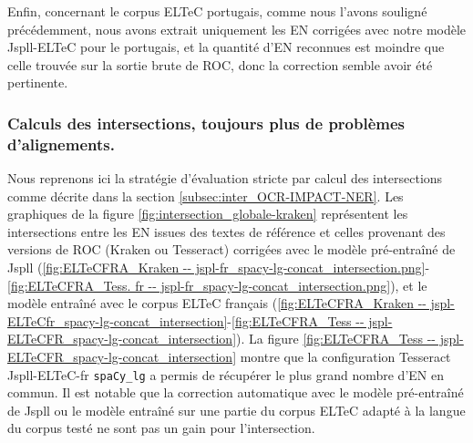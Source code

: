 Enfin, concernant le corpus ELTeC portugais, comme nous l'avons souligné précédemment, nous avons extrait uniquement les EN corrigées avec notre modèle Jspll-ELTeC pour le portugais, et la quantité d'EN reconnues est moindre que celle trouvée sur la sortie brute de ROC, donc la correction semble avoir été pertinente.

\subsubsection{Calculs des intersections, toujours plus de problèmes d'alignements. }

Nous reprenons ici la stratégie d'évaluation stricte par calcul des intersections comme décrite dans la section \ref{subsec:inter_OCR-IMPACT-NER}.
Les graphiques de la figure \ref{fig:intersection_globale-kraken} représentent les intersections entre les EN issues des textes de référence et celles provenant des versions de ROC (Kraken ou Tesseract) corrigées avec le modèle pré-entraîné de Jspll (\ref{fig:ELTeCFRA_Kraken -- jspl-fr_spacy-lg-concat_intersection.png}-\ref{fig:ELTeCFRA_Tess. fr -- jspl-fr_spacy-lg-concat_intersection.png}), et le modèle entraîné avec le corpus ELTeC français (\ref{fig:ELTeCFRA_Kraken -- jspl-ELTeCfr_spacy-lg-concat_intersection}-\ref{fig:ELTeCFRA_Tess -- jspl-ELTeCFR_spacy-lg-concat_intersection}). La figure \ref{fig:ELTeCFRA_Tess -- jspl-ELTeCFR_spacy-lg-concat_intersection} montre que la configuration Tesseract Jspll-ELTeC-fr \texttt{spaCy\_lg} a permis de récupérer le plus grand nombre d'EN en commun. Il est notable que la correction automatique avec le modèle pré-entraîné de Jspll ou le modèle entraîné sur une partie du corpus ELTeC adapté à la langue du corpus testé ne sont pas un gain pour l'intersection. 
